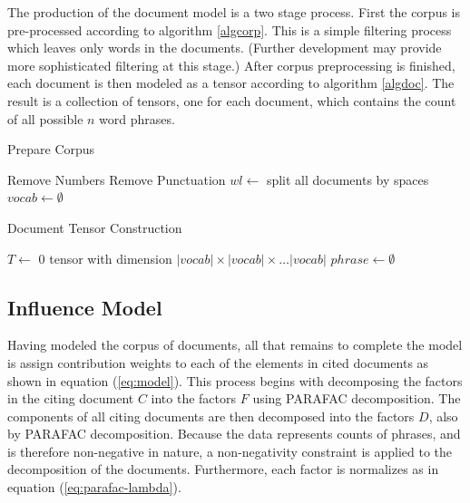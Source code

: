\documentclass{article}
\begin{document}
The production of the document model is a two stage process.  First
the corpus is pre-processed according to algorithm \ref{algcorp}.
This is a simple filtering process which leaves only words in the
documents.  (Further development may provide more sophisticated
filtering at this stage.)  After corpus preprocessing is finished,
each document is then modeled as a tensor according to algorithm
\ref{algdoc}.  The result is a collection of tensors, one for each
document, which contains the count of all possible $n$ word phrases.

\begin{algorithm}
\caption{Prepare Corpus}
\label{algcorp}
    Remove Numbers\;
    Remove Punctuation\;
    $wl \leftarrow $ split all documents by spaces\;
    $vocab \leftarrow \emptyset$\;
     {
    }
\end{algorithm}


\begin{algorithm}
\caption{Document Tensor Construction}
\label{algdoc}
    $T \leftarrow$ 0 tensor with dimension $|vocab| \times |vocab| \times \ldots
    |vocab|$\;
    $phrase \leftarrow \emptyset$ \;
\end{algorithm}


\subsection{Influence Model}
Having modeled the corpus of documents, all that remains to complete
the model is assign contribution weights to each of the elements in
cited documents as shown in equation (\ref{eq:model}).   This process
begins with decomposing the factors in the citing document $C$ into
the factors $F$ using PARAFAC decomposition.  The components of all
citing documents are then decomposed into the factors $D$, also by
PARAFAC decomposition. Because the data represents counts of phrases,
and is therefore non-negative in nature, a non-negativity constraint
is applied to the decomposition of the documents. Furthermore, each
factor is normalizes as in equation (\ref{eq:parafac-lambda}).
\end{document}
